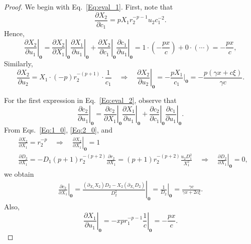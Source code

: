 \documentclass[11pt]{article}
\theoremstyle{definition}
\begin{document}
\begin{proof}
	We begin with Eq.~\eqref{Eq:eval_1}.
	First, note that
	$$ \frac{\partial X_2}{\partial c_1} = p X_1 r_2^{-p-1} u_2 c_1^{-2}.$$
	Hence,
	\begin{equation}
	\left.\frac{\partial X_2}{\partial u_1}\right|_{\mathbf{0}}
	=
	\left.\frac{\partial X_2}{\partial X_1}\right|_{\mathbf{0}}\left.\frac{\partial X_1}{\partial u_1}\right|_{\mathbf{0}}
	+
	\left.\frac{\partial X_2}{\partial c_1}\right|_{\mathbf{0}}\left.\frac{\partial c_1}{\partial u_1}\right|_{\mathbf{0}}
	=
	1\cdot\left(-\frac{p x}{c}\right)+0\cdot(\cdots)
	=
	-\frac{p x}{c}, \label{Eq:X2_u1_0}
	\end{equation}
	Similarly,
	\begin{equation}
	\frac{\partial X_2}{\partial u_2} = 
	X_1\cdot(-p) r_2^{-(p+1)}\cdot\frac{1}{c_1}
	\quad\Rightarrow\quad
	\left.\frac{\partial X_2}{\partial u_2}\right|_{\mathbf{0}}
	= -\frac{p X_1}{c_1}\bigg|_{\mathbf{0}}
	= -\frac{p(\gamma x+c\xi)}{\gamma c}. \label{Eq:X2_u2_0}
	\end{equation}

	For the first expression in Eq.~\eqref{Eq:eval_2}, observe that
	\begin{equation}
	\left.\frac{\partial c_2}{\partial u_1}\right|_{\mathbf{\mathbf{0}}}
	= \left.\frac{\partial c_2}{\partial X_1}\right|_{\mathbf{0}}\left.\frac{\partial X_1}{\partial u_1}\right|_{\mathbf{0}} + 
	\left.\frac{\partial c_2}{\partial c_1}\right|_{\mathbf{0}}\left.\frac{\partial c_1}{\partial u_1}\right|_{\mathbf{0}}. \label{Eq:dc2_du1}
	\end{equation}
	From Eqs.~\eqref{Eq:1_0}, \eqref{Eq:2_0}, and
	\begin{align*}
	&\frac{\partial {X_2}}{\partial X_1} = r_2^{-p} \quad\Rightarrow\quad  \left. \frac{\partial {X_2}}{\partial X_1} \right|_{\mathbf{0}} = 1 \\ 
	& \frac{\partial{D_2}}{\partial X_1} =  - D_1 (p+1) r_2^{-(p+2)}\frac{\partial r_2}{\partial X_1} =  (p+1) r_2^{-(p+2)}\frac{u_2 D_1^2}{X_1^2} \quad\Rightarrow\quad  \left. \frac{\partial {D_2}}{\partial X_1} \right|_{\mathbf{0}} = 0,
	\end{align*}
	we obtain
	\begin{align}
		\left.\frac{\partial c_2}{\partial X_1}\right|_{\mathbf{0}} = \left. \frac{(\partial_{X_1}X_2) D_2 - X_2 (\partial_{X_1}D_2)}{D_2^2} \right|_{\mathbf{0}} = \left. \frac{1}{D_2} \right|_{\mathbf{0}} =  \frac{\gamma c}{\gamma x + 2c\xi }. \label{Eq:dc2_dX1}
	\end{align} 
	Also,
	\begin{equation}
	\left. \frac{\partial X_1}{\partial u_1} \right|_{\mathbf{{0}}} = \left. - x p r_{1}^{-p-1}\frac{1}{c} \right|_{\mathbf{{0}}}= -\frac{px}{c}. \label{Eq:dX_1_du_1_0}
	\end{equation}
	

\end{proof}
\end{document}
